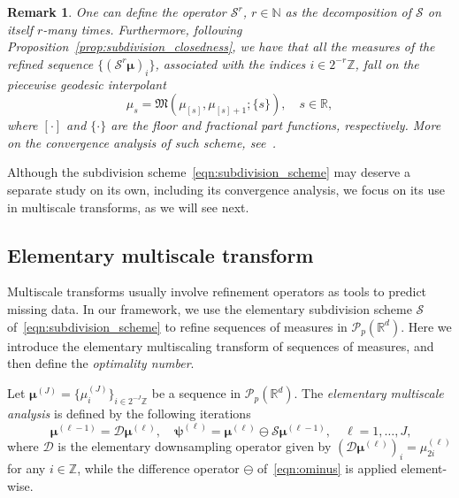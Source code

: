 \documentclass[12pt]{amsart}
\newtheorem{remark}{Remark}[section]
\begin{document}
\begin{remark}
    One can define the operator $\mathcal{S}^r$, $r\in\mathbb{N}$ as the decomposition of $\mathcal{S}$ on itself $r$-many times. Furthermore, following Proposition~\ref{prop:subdivision_closedness}, we have that all the measures of the refined sequence $\{(\mathcal{S}^r\boldsymbol{\mu})_i\}$, associated with the indices $i\in 2^{-r}\mathbb{Z}$, fall on the piecewise geodesic interpolant
    \begin{equation*}
        \mu_s = \mathfrak{M}(\mu_{[s]}, \mu_{[s]+1}; \{s\}), \quad s\in\mathbb{R},
    \end{equation*}
    where $[\cdot]$ and $\{\cdot\}$ are the floor and fractional part functions, respectively. More on the convergence analysis of such scheme, see~\cite{DynSharon2025}.
\end{remark}

Although the subdivision scheme~\eqref{eqn:subdivision_scheme} may deserve a separate study on its own, including its convergence analysis, we focus on its use in multiscale transforms, as we will see next.

\subsection{Elementary multiscale transform}

Multiscale transforms usually involve refinement operators as tools to predict missing data. In our framework, we use the elementary subdivision scheme $\mathcal{S}$ of~\eqref{eqn:subdivision_scheme} to refine sequences of measures in $\mathcal{P}_p(\mathbb{R}^d)$. Here we introduce the elementary multiscaling transform of sequences of measures, and then define the \emph{optimality number}.

Let $\boldsymbol{\mu}^{(J)}=\{\mu^{(J)}_i\}_{i\in 2^{-J}\mathbb{Z}}$ be a sequence in $\mathcal{P}_p(\mathbb{R}^d)$. The \emph{elementary multiscale analysis} is defined by the following iterations
\begin{equation}~\label{eqn:elementary_multiscaling}
    \boldsymbol{\mu}^{(\ell-1)}=\mathcal{D}\boldsymbol{\mu}^{(\ell)}, \quad \boldsymbol{\psi}^{(\ell)}= \boldsymbol{\mu}^{(\ell)} \ominus \mathcal{S}\boldsymbol{\mu}^{(\ell-1)}, \quad \ell=1,\dots, J,
\end{equation}
where $\mathcal{D}$ is the elementary downsampling operator given by $(\mathcal{D}\boldsymbol{\mu}^{(\ell)})_i=\mu^{(\ell)}_{2i}$ for any $i\in\mathbb{Z}$, while the difference operator $\ominus$ of~\eqref{eqn:ominus} is applied element-wise.
\end{document}
